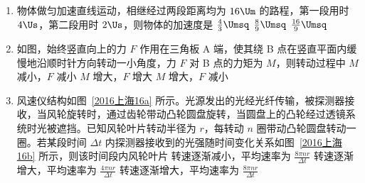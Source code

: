\documentclass[\gkver]{gaokaozhenti}
\begin{document}
\begin{enumerate}
\item
物体做匀加速直线运动，相继经过两段距离均为 $16\Um$ 的路程，第一段用时 $4\Us$，第二段用时 $2\Us$，则物体的加速度是
{$\frac{4}{3}\Umsq$}
{$\frac{8}{9}\Umsq$}
{$\frac{16}{9}\Umsq$}

\item
如图，始终竖直向上的力 $F$ 作用在三角板 A 端，使其绕 B 点在竖直平面内缓慢地沿顺时针方向转动一小角度，力 $F$ 对 B 点的力矩为 $M$，则转动过程中
\onepicture[w=3.34cm]{}
{$M$ 减小，$F$ 减小}
{$M$ 增大，$F$ 增大}
{$M$ 增大，$F$ 减小}

\item
风速仪结构如图~\ref{2016上海16a} 所示。光源发出的光经光纤传输，被探测器接收，当风轮旋转时，通过齿轮带动凸轮圆盘旋转，当圆盘上的凸轮经过透镜系统时光被遮挡。已知风轮叶片转动半径为 $r$，每转动 $n$ 圈带动凸轮圆盘转动一圈。若某段时间 $\Delta t$ 内探测器接收到的光强随时间变化关系如图~\ref{2016上海16b} 所示，则该时间段内风轮叶片
\twopicture[labelA=2016上海16a, labelB=2016上海16b, numA=（a）, numB=（b）, wA=5.30cm, wB=4.22cm]
{}
{}
{转速逐渐减小，平均速率为 $\frac{8\pi nr}{\Delta t}$}
{转速逐渐增大，平均速率为 $\frac{4\pi nr}{\Delta t}$}
{转速逐渐增大，平均速率为 $\frac{8\pi nr}{\Delta t}$}


\end{enumerate}
\end{document}
